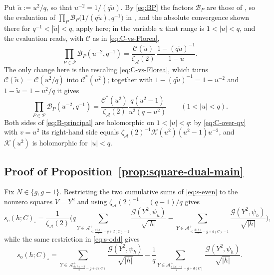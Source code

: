 \documentclass[a4paper,reqno]{amsart}
\numberwithin{equation}{section}
\theoremstyle{remark}
\theoremstyle{definition}
\newcommand{\A}{\mathcal{A}}
\newcommand{\zA}{\zeta_{\A}}
\newcommand{\Gc}{\mathcal{G}}
\begin{document}
Put $\tilde u:=u^2/q$, so that $u^{-2}=1/(q\tilde u)$. By \eqref{eq:BP} the
factors $\mathcal B_P$ are those of \cite[Lemma~6.2]{Fl17-1}, so the
evaluation of $\prod_{P}\mathcal B_P\bigl(1/(q\tilde u),q^{-1}\bigr)$ in
\cite[Section~6]{Fl17-1}, and the absolute convergence shown there for
$q^{-1}<|\tilde u|<q$, apply here; in the variable $u$ that range is
$1<|u|<q$, and the evaluation reads, with $\mathcal C$ as in
\eqref{eq:C-vs-Florea},
$$
\prod_{P\in\mathcal P}\mathcal B_P(u^{-2},q^{-1})
=
\frac{\mathcal C(\tilde u)}{\zA(2)}\,
\frac{1-(q\tilde u)^{-1}}{1-\tilde u}.
$$
The only change here is the rescaling \eqref{eq:C-vs-Florea}, which turns
$\mathcal C(\tilde u)=\mathcal C(u^2/q)$ into $\mathcal C^*(u^2)$; together
with $1-(q\tilde u)^{-1}=1-u^{-2}$ and $1-\tilde u=1-u^2/q$ it gives
\begin{equation}\label{eq:B-principal}
\prod_{P\in\mathcal P}\mathcal{B}_P(u^{-2},q^{-1})
=
\frac{\mathcal C^*(u^2)}{\zA(2)}
\frac{q(u^2-1)}{u^2(q-u^2)}
\qquad(1<|u|<q).
\end{equation}
Both sides of \eqref{eq:B-principal} are holomorphic on $1<|u|<q$: by
\eqref{eq:C-over-qv} with $v=u^2$ its right-hand side equals
$\zA(2)^{-1}\mathcal K(u^2)(u^2-1)u^{-2}$, and $\mathcal K(u^2)$ is
holomorphic for $|u|<q$.

\subsection{Proof of Proposition~\ref{prop:square-dual-main}}

Fix $N\in\{g,g-1\}$. Restricting the two cumulative sums of
\eqref{eq:s-even} to the nonzero squares $V=Y^2$ and using
$\zA(2)^{-1}=(q-1)/q$ gives
\begin{equation}\label{eq:SN-even-square}
s_{\mathrm e}(h;C)_{\square}
=\frac{1}{\zA(2)}
\Biggl(q\sum_{Y\in\A^+_{\le\frac{d(h)}{2}-g+d(C)-2}}\frac{\Gc(Y^2,\psi_h)}{\sqrt{|h|}}
-\sum_{Y\in\A^+_{\le\frac{d(h)}{2}-g+d(C)-1}}\frac{\Gc(Y^2,\psi_h)}{\sqrt{|h|}}\Biggr),
\end{equation}
while the same restriction in \eqref{eq:s-odd} gives
\begin{equation}\label{eq:SN-odd-square}
s_{\mathrm o}(h;C)_{\square}
=\sum_{Y\in\A^+_{\frac{d(h)-3}{2}-g+d(C)}}\frac{\Gc(Y^2,\psi_h)}{\sqrt{|h|}}
-\frac{1}{q}\sum_{Y\in\A^+_{\frac{d(h)-1}{2}-g+d(C)}}\frac{\Gc(Y^2,\psi_h)}{\sqrt{|h|}}.
\end{equation}
\end{document}

